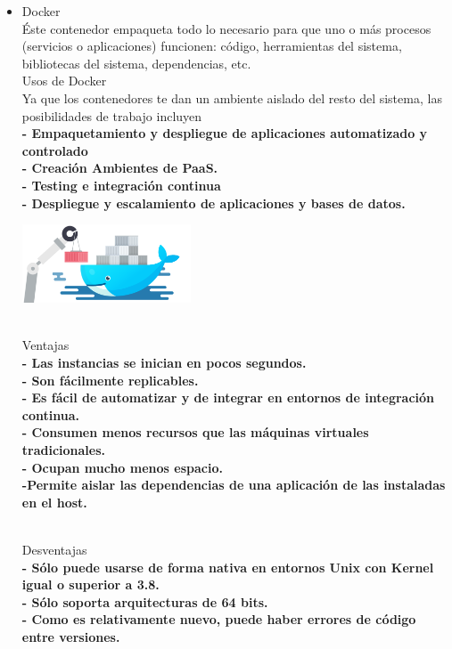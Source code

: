 \documentclass[twoside,twocolumn]{article}
\begin{document}
\begin{itemize}
\item Docker
\\ Éste contenedor empaqueta todo lo necesario para que uno o más procesos (servicios o
aplicaciones) funcionen: código, herramientas del sistema, bibliotecas del sistema, dependencias,
etc.
\\Usos de Docker
\\Ya que los contenedores te dan un ambiente aislado del resto del sistema, las posibilidades de
trabajo incluyen
\\ \textbf{- Empaquetamiento y despliegue de aplicaciones automatizado y controlado}
\\ \textbf{- Creación Ambientes de PaaS.}
\\ \textbf{- Testing e integración continua}
\\ \textbf{- Despliegue y escalamiento de aplicaciones y bases de datos.}

\begin{center}
	\includegraphics[width=5cm]{./Imagenes/docker} 
	\end{center}

\\ Ventajas
\\ \textbf{- Las instancias se inician en pocos segundos.}
\\ \textbf{- Son fácilmente replicables.}
\\ \textbf{- Es fácil de automatizar y de integrar en entornos de integración continua.}
\\ \textbf{- Consumen menos recursos que las máquinas virtuales tradicionales.}
\\ \textbf{- Ocupan mucho menos espacio.}
\\ \textbf{-Permite aislar las dependencias de una aplicación de las instaladas en el host.}

\\ Desventajas
\\ \textbf{- Sólo puede usarse de forma nativa en entornos Unix con Kernel igual o superior a 3.8.}
\\ \textbf{- Sólo soporta arquitecturas de 64 bits.}
\\ \textbf{- Como es relativamente nuevo, puede haber errores de código entre versiones.}
\end{itemize} 
\end{document}
